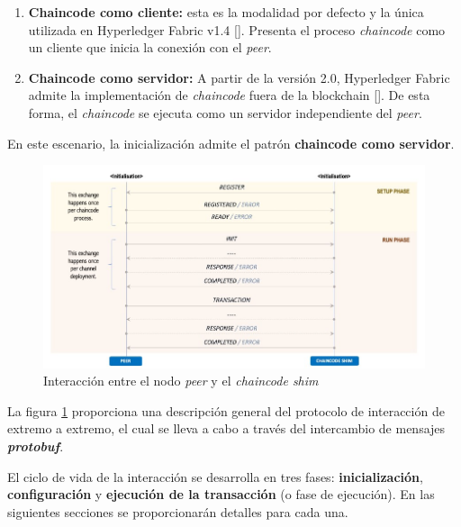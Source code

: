 \begin{enumerate}
\item \textbf{Chaincode como cliente:} esta es la modalidad por defecto y la única utilizada en Hyperledger Fabric v1.4 [\cite{hlf-internals}]. Presenta el proceso \textit{chaincode} como un cliente que inicia la conexión con el \textit{peer}.

\item \textbf{Chaincode como servidor:} A partir de la versión 2.0, Hyperledger Fabric admite la implementación de \textit{chaincode} fuera de la blockchain [\cite{hlf-internals}]. De esta forma, el \textit{chaincode} se ejecuta como un servidor independiente del \textit{peer}.
\end{enumerate}

En este escenario, la inicialización admite el patrón \textbf{chaincode como  servidor}.




\begin{figure}[tbph]
\centering
\includegraphics[width=\textwidth]{Images/interaction_protocol}
\caption{Interacción entre el nodo \textit{peer} y el \textit{chaincode shim}}
\label{fig:interactionprotocol}
\end{figure}

La figura \ref{fig:interactionprotocol} proporciona una descripción general del protocolo de interacción de extremo a extremo, el cual se lleva a cabo a través del intercambio de mensajes \textit{\textbf{protobuf}}.

El ciclo de vida de la interacción se desarrolla en tres fases: \textbf{inicialización}, \textbf{configuración} y \textbf{ejecución de la transacción} (o fase de ejecución). En las siguientes secciones se proporcionarán detalles para cada una.

